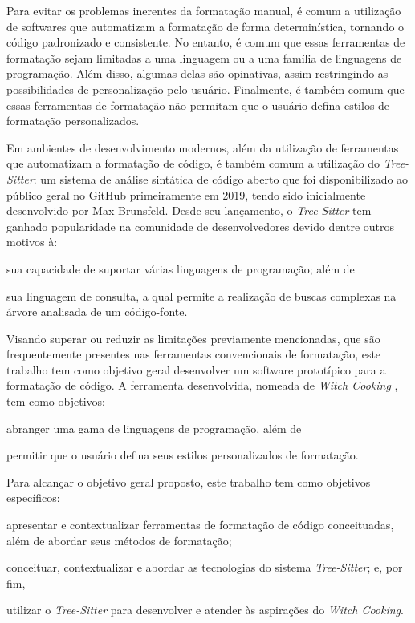 \documentclass
  [11pt,a4paper,english,brazil,openright,sumario=tradicional,twoside]
  {abntex2}
\newcommand{\treesitter}{\textit{Tree-Sitter}\xspace}
\newcommand{\witchcooking}{\textit{Witch Cooking}\xspace}
\begin{document}
  Para evitar os problemas inerentes da formatação manual, é comum a utilização
  de softwares que automatizam a formatação de forma determinística, tornando o
  código padronizado e consistente. No entanto, é comum que essas ferramentas
  de formatação sejam limitadas a uma linguagem ou a uma família de linguagens
  de programação. Além disso, algumas delas são opinativas, assim restringindo
  as possibilidades de personalização pelo usuário. Finalmente, é também comum
  que essas ferramentas de formatação não permitam que o usuário defina estilos
  de formatação personalizados.

  Em ambientes de desenvolvimento modernos, além da utilização de ferramentas
  que automatizam a formatação de código, é também comum a utilização do
  \treesitter \cite{tree-sitter-2018-tree}: um sistema de análise sintática de
  código aberto que foi disponibilizado ao público geral no GitHub
  primeiramente em 2019, tendo sido inicialmente desenvolvido por Max
  Brunsfeld. Desde seu lançamento, o \treesitter tem ganhado popularidade na
  comunidade de desenvolvedores devido dentre outros motivos à:
  \begin{inparaenum}
    \item sua capacidade de suportar várias linguagens de programação; além de
    \item sua linguagem de consulta, a qual permite a realização de buscas
          complexas na árvore analisada de um código-fonte.
  \end{inparaenum}

  Visando superar ou reduzir as limitações previamente mencionadas, que são
  frequentemente presentes nas ferramentas convencionais de formatação, este
  trabalho tem como objetivo geral desenvolver um software prototípico para a
  formatação de código. A ferramenta desenvolvida, nomeada de \witchcooking
  \cite{silva-2023-witch}, tem como objetivos:
  \begin{inparaenum}
    \item abranger uma gama de linguagens de programação, além de
    \item permitir que o usuário defina seus estilos personalizados de
          formatação.
  \end{inparaenum}

  Para alcançar o objetivo geral proposto, este trabalho tem como objetivos
  específicos:
  \begin{inparaenum}
    \item apresentar e contextualizar ferramentas de formatação de código
          conceituadas, além de abordar seus métodos de formatação;
    \item conceituar, contextualizar e abordar as tecnologias do sistema
          \treesitter; e, por fim,
    \item utilizar o \treesitter para desenvolver e atender às aspirações do
          \witchcooking.
  \end{inparaenum}
\end{document}
